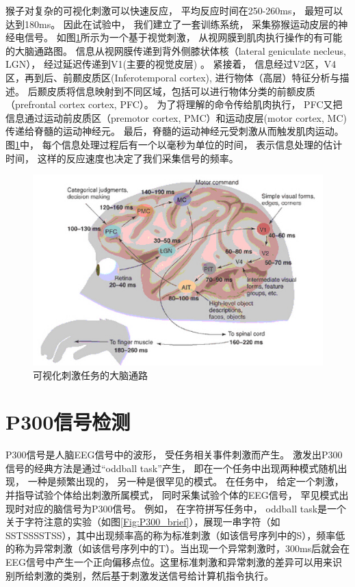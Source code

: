 猴子对复杂的可视化刺激可以快速反应， 平均反应时间在250-260ms， 最短可以达到180ms。 因此在试验中， 我们建立了一套训练系统， 采集猕猴运动皮层的神经电信号。 如图\ref{Fig:brain_stimulate_flow}所示为一个基于视觉刺激， 从视网膜到肌肉执行操作的有可能的大脑通路图\cite{thorpe2001seeking}。 信息从视网膜传递到背外侧膝状体核（lateral geniculate necleus, LGN）， 经过延迟传递到V1(主要的视觉皮层) 。 紧接着， 信息经过V2区，V4区，再到后、前颞皮质区(Inferotemporal cortex), 进行物体（高层）特征分析与描述。 后颞皮质将信息映射到不同区域，包括可以进行物体分类的前额皮质（prefrontal cortex cortex, PFC）。 为了将理解的命令传给肌肉执行， PFC又把信息通过运动前皮质区（premotor cortex, PMC）和运动皮层(motor cortex, MC)传递给脊髓的运动神经元。 最后，脊髓的运动神经元受刺激从而触发肌肉运动。 图\ref{Fig:brain_stimulate_flow}中， 每个信息处理过程后有一个以毫秒为单位的时间， 表示信息处理的估计时间， 这样的反应速度也决定了我们采集信号的频率。

\begin{figure}[htb]
\centering
\includegraphics{Pictures/Introduction/brain_flow.jpg}
\caption{可视化刺激任务的大脑通路\cite{thorpe2001seeking}}
\label{Fig:brain_stimulate_flow}
\end{figure}



\section{P300信号检测}\label{sec:introduction_p300}

P300信号是人脑EEG信号中的波形， 受任务相关事件刺激而产生。 激发出P300信号的经典方法是通过“oddball task”产生， 即在一个任务中出现两种模式随机出现， 一种是频繁出现的， 另一种是很罕见的模式。 在任务中， 给定一个刺激，并指导试验个体给出刺激所属模式， 同时采集试验个体的EEG信号， 罕见模式出现时对应的脑信号为P300信号。 例如， 在字符拼写任务中， oddball task是一个关于字符注意的实验（如图\ref{Fig:P300_brief}\cite{polich2007updating}），展现一串字符（如SSTSSSSTSS），其中出现频率高的称为标准刺激（如该信号序列中的S），频率低的称为异常刺激（如该信号序列中的T）。当出现一个异常刺激时，300ms后就会在EEG信号中产生一个正向偏移点位。这里标准刺激和异常刺激的差异可以用来识别所给刺激的类别，然后基于刺激发送信号给计算机指令执行。
 
